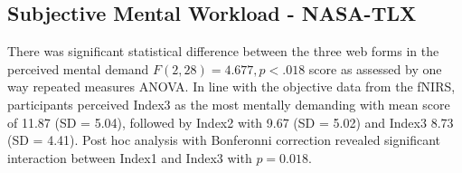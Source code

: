 \documentclass[../main/Feedback.tex]{subfiles}
\begin{document}
		
\subsection{Subjective Mental Workload - NASA-TLX}
There was significant statistical difference between the three web forms in the perceived mental demand $F(2,28)=4.677, p<.018$ score as assessed by one way repeated measures ANOVA. 
In line with the objective data from the fNIRS, participants perceived Index3 as the most mentally demanding with mean score of 11.87 (SD = 5.04), followed by Index2 with 9.67 (SD = 5.02) and Index3 8.73 (SD = 4.41).
Post hoc analysis with Bonferonni correction revealed significant interaction between Index1 and Index3 with $p=0.018$.
		
\end{document}
